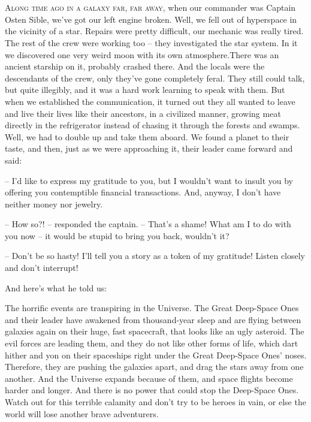 \documentclass[ebook,twoside,final,openright]{memoir}
\begin{document}
\chapter{}
\par
\lettrine{A}{long time ago in a galaxy far, far away,} when our commander was Captain Osten Sible, we’ve got our left engine broken. Well, we fell out of hyperspace in the vicinity of a star. Repairs were pretty difficult, our mechanic was really tired. The rest of the crew were working too – they investigated the star system. In it we discovered one very weird moon with its own atmosphere.There was an ancient starship on it, probably crashed there. And the locals were the descendants of the crew, only they’ve gone completely feral. They still could talk, but quite illegibly, and it was a hard work learning to speak with them. But when we established the communication, it turned out they all wanted to leave and live their lives like their ancestors, in a civilized manner, growing meat directly in the refrigerator instead of chasing it through the forests and swamps. Well, we had to double up and take them aboard. We found a planet to their taste, and then, just as we were approaching it, their leader came forward and said: \par
\par
– I'd like to express my gratitude to you, but I wouldn’t want to insult you by offering you contemptible financial transactions. And, anyway, I don’t have neither money nor jewelry.\par
– How so?! – responded the captain. – That's a shame! What am I to do with you now – it would be stupid to bring you back, wouldn’t it? \par
– Don’t be so hasty! I'll tell you a story as a token of my gratitude! Listen closely and don’t interrupt! \par
 And here’s what he told us:\par
\par
The horrific events are transpiring in the Universe. The Great Deep-Space Ones and their leader have awakened from thousand-year sleep and are flying between galaxies again on their huge, fast spacecraft, that looks like an ugly asteroid. The evil forces are leading them, and they do not like other forms of life, which dart hither and yon on their spaceships right under the Great Deep-Space Ones’ noses. Therefore, they are pushing the galaxies apart, and drag the stars away from one another. And the Universe expands because of them, and space flights become harder and longer. And there is no power that could stop the Deep-Space Ones. Watch out for this terrible calamity and don’t try to be heroes in vain, or else the world will lose another brave adventurers.\par
\end{document}
